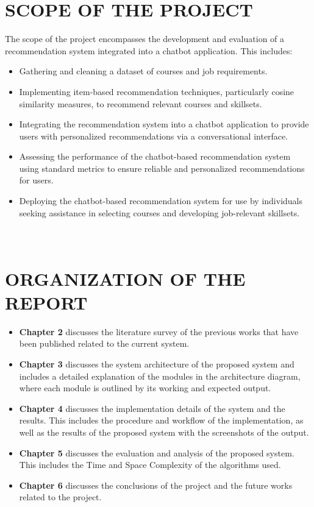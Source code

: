 \section{\uppercase{Scope of the Project}}
The scope of the project encompasses the development and evaluation of a recommendation
system integrated into a chatbot application. This includes:
\begin{itemize}
    \item Gathering and cleaning a dataset of courses and job requirements.

    \item Implementing item-based recommendation techniques, particularly cosine
        similarity measures, to recommend relevant courses and skillsets.

    \item Integrating the recommendation system into a chatbot application to provide
        users with personalized recommendations via a conversational interface.

    \item Assessing the performance of the chatbot-based recommendation system using
        standard metrics to ensure reliable and personalized recommendations for users.

    \item Deploying the chatbot-based recommendation system for use by individuals
        seeking assistance in selecting courses and developing job-relevant skillsets.
        \\ \\ \\
\end{itemize}

\section{\uppercase{Organization of the Report}}
\begin{itemize}
    \item \textbf{Chapter 2} discusses the literature survey of the previous works
        that have been published related to the current system.

    \item \textbf{Chapter 3} discusses the system architecture of the proposed
        system and includes a detailed explanation of the modules in the
        architecture diagram, where each module is outlined by its working and expected
        output.

    \item \textbf{Chapter 4} discusses the implementation details of the system
        and the results. This includes the procedure and workflow of the implementation,
        as well as the results of the proposed system with the screenshots of the
        output.

    \item \textbf{Chapter 5} discusses the evaluation and analysis of the proposed
        system. This includes the Time and Space Complexity of the algorithms used.

    \item \textbf{Chapter 6} discusses the conclusions of the project and the
        future works related to the project.
\end{itemize}